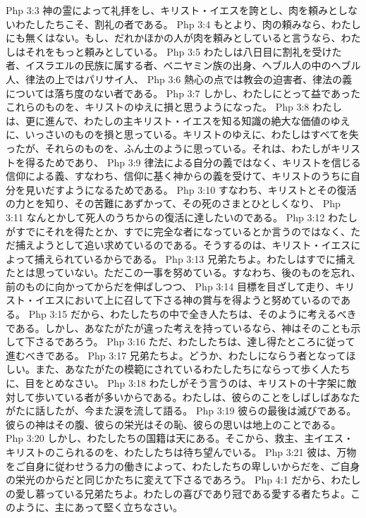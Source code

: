 Php 3:3  神の霊によって礼拝をし、キリスト・イエスを誇とし、肉を頼みとしないわたしたちこそ、割礼の者である。
Php 3:4  もとより、肉の頼みなら、わたしにも無くはない。もし、だれかほかの人が肉を頼みとしていると言うなら、わたしはそれをもっと頼みとしている。
Php 3:5  わたしは八日目に割礼を受けた者、イスラエルの民族に属する者、ベニヤミン族の出身、ヘブル人の中のヘブル人、律法の上ではパリサイ人、
Php 3:6  熱心の点では教会の迫害者、律法の義については落ち度のない者である。
Php 3:7  しかし、わたしにとって益であったこれらのものを、キリストのゆえに損と思うようになった。
Php 3:8  わたしは、更に進んで、わたしの主キリスト・イエスを知る知識の絶大な価値のゆえに、いっさいのものを損と思っている。キリストのゆえに、わたしはすべてを失ったが、それらのものを、ふん土のように思っている。それは、わたしがキリストを得るためであり、
Php 3:9  律法による自分の義ではなく、キリストを信じる信仰による義、すなわち、信仰に基く神からの義を受けて、キリストのうちに自分を見いだすようになるためである。
Php 3:10  すなわち、キリストとその復活の力とを知り、その苦難にあずかって、その死のさまとひとしくなり、
Php 3:11  なんとかして死人のうちからの復活に達したいのである。
Php 3:12  わたしがすでにそれを得たとか、すでに完全な者になっているとか言うのではなく、ただ捕えようとして追い求めているのである。そうするのは、キリスト・イエスによって捕えられているからである。
Php 3:13  兄弟たちよ。わたしはすでに捕えたとは思っていない。ただこの一事を努めている。すなわち、後のものを忘れ、前のものに向かってからだを伸ばしつつ、
Php 3:14  目標を目ざして走り、キリスト・イエスにおいて上に召して下さる神の賞与を得ようと努めているのである。
Php 3:15  だから、わたしたちの中で全き人たちは、そのように考えるべきである。しかし、あなたがたが違った考えを持っているなら、神はそのことも示して下さるであろう。
Php 3:16  ただ、わたしたちは、達し得たところに従って進むべきである。
Php 3:17  兄弟たちよ。どうか、わたしにならう者となってほしい。また、あなたがたの模範にされているわたしたちにならって歩く人たちに、目をとめなさい。
Php 3:18  わたしがそう言うのは、キリストの十字架に敵対して歩いている者が多いからである。わたしは、彼らのことをしばしばあなたがたに話したが、今また涙を流して語る。
Php 3:19  彼らの最後は滅びである。彼らの神はその腹、彼らの栄光はその恥、彼らの思いは地上のことである。
Php 3:20  しかし、わたしたちの国籍は天にある。そこから、救主、主イエス・キリストのこられるのを、わたしたちは待ち望んでいる。
Php 3:21  彼は、万物をご自身に従わせうる力の働きによって、わたしたちの卑しいからだを、ご自身の栄光のからだと同じかたちに変えて下さるであろう。
Php 4:1  だから、わたしの愛し慕っている兄弟たちよ。わたしの喜びであり冠である愛する者たちよ。このように、主にあって堅く立ちなさい。
